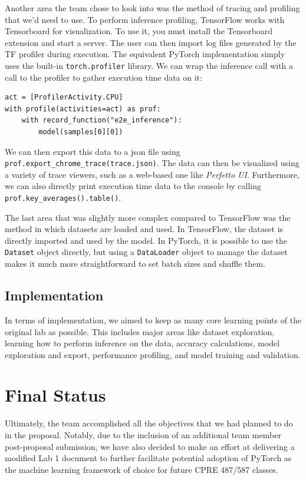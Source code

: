 \documentclass[letterpaper,twocolumn,10pt]{article}
\begin{document}
Another area the team chose to look into was the method of tracing and profiling that we'd need to use. To perform inference profiling, TensorFlow works with Tensorboard for visualization. To use it, you must install the Tensorboard extension and start a server. The user can then import log files generated by the TF profiler during execution. The equivalent PyTorch implementation simply uses the built-in \verb|torch.profiler| library. We can wrap the inference call with a call to the profiler to gather execution time data on it:
\begin{verbatim}
act = [ProfilerActivity.CPU]
with profile(activities=act) as prof:
    with record_function("e2e_inference"):
        model(samples[0][0])
\end{verbatim}
We can then export this data to a json file using \verb|prof.export_chrome_trace(trace.json)|. The data can then be visualized using a variety of trace viewers, such as a web-based one like \textit{Perfetto UI}. Furthermore, we can also directly print execution time data to the console by calling \verb|prof.key_averages().table()|.

The last area that was slightly more complex compared to TensorFlow was the method in which datasets are loaded and used. In TensorFlow, the dataset is directly imported and used by the model. In PyTorch, it is possible to use the \verb|Dataset| object directly, but using a \verb|DataLoader| object to manage the dataset makes it much more straightforward to set batch sizes and shuffle them.

\subsection{Implementation}
In terms of implementation, we aimed to keep as many core learning points of the original lab as possible. This includes major areas like dataset exploration, learning how to perform inference on the data, accuracy calculations, model exploration and export, performance profiling, and model training and validation.

\section{Final Status}
Ultimately, the team accomplished all the objectives that we had planned to do in the proposal. Notably, due to the inclusion of an additional team member post-proposal submission, we have also decided to make an effort at delivering a modified Lab 1 document to further facilitate potential adoption of PyTorch as the machine learning framework of choice for future CPRE 487/587 classes.
\end{document}
